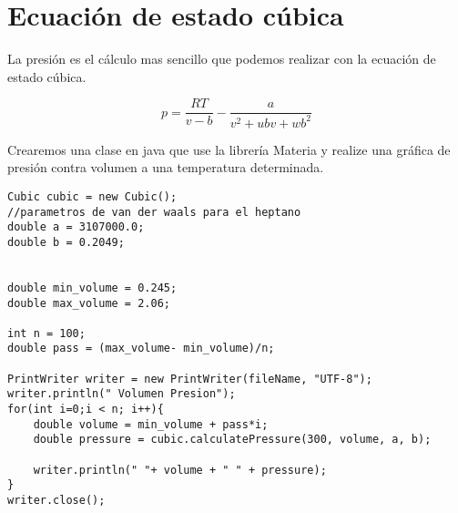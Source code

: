 \section{Ecuación de estado cúbica}
 La presión es el cálculo mas sencillo que podemos realizar con la ecuación de estado cúbica.

\begin{equation}
	p = \frac{R T}{v-b} - \frac{a}{v^2 +u b v + w b^2 }
\end{equation}

 Crearemos una clase en java que use la librería Materia y realize una gráfica de presión contra volumen a una temperatura determinada.






\begin{lstlisting}[label=se,caption=Some Code]
Cubic cubic = new Cubic();
//parametros de van der waals para el heptano
double a = 3107000.0;
double b = 0.2049;


double min_volume = 0.245;
double max_volume = 2.06;

int n = 100;
double pass = (max_volume- min_volume)/n;

PrintWriter writer = new PrintWriter(fileName, "UTF-8");
writer.println(" Volumen Presion");
for(int i=0;i < n; i++){
	double volume = min_volume + pass*i;
	double pressure = cubic.calculatePressure(300, volume, a, b);
	
	writer.println(" "+ volume + " " + pressure);
}
writer.close();		
\end{lstlisting}
















